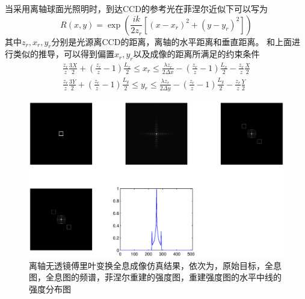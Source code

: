 \documentclass[11pt,a4paper]{article}
\begin{document}
当采用离轴球面光照明时，到达CCD的参考光在菲涅尔近似下可以写为
\begin{equation}
R(x,y) = \exp(\frac{i k}{2 z_r}[(x-x_r)^2+(y-y_r)^2])
\end{equation}
其中$z_r, x_r, y_r$分别是光源离CCD的距离，离轴的水平距离和垂直距离。
和上面进行类似的推导，可以得到偏置$x_r,y_r$以及成像的距离所满足的约束条件
\begin{equation}
\begin{split}
\frac{z_r}{z}\frac{3X}{2} + (\frac{z_r}{z}-1)\frac{L_x}{2} \le x_r \le \frac{\lambda z_r}{2\Delta x} - (\frac{z_r}{z}-1)\frac{L_x}{2}-\frac{z_r}{z}\frac{X}{2} \\
\frac{z_r}{z}\frac{3Y}{2} + (\frac{z_r}{z}-1)\frac{L_y}{2} \le y_r \le \frac{\lambda z_r}{2\Delta y} - (\frac{z_r}{z}-1)\frac{L_y}{2}-\frac{z_r}{z}\frac{Y}{2} 
\end{split}
\end{equation}






\begin{figure}[htb]
  \centering
  \includegraphics[width=\textwidth]{kuang_sphere.eps}
  \caption{离轴无透镜傅里叶变换全息成像仿真结果，依次为，原始目标，全息图，全息图的频谱，菲涅尔重建的强度图，重建强度图的水平中线的强度分布图}
  \label{fig:res_kuang_sphere}
\end{figure}
\end{document}
